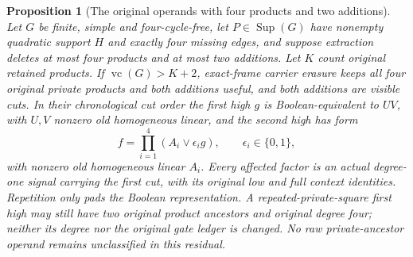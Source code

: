 \documentclass[11pt]{article}
\newcommand{\Sup}{\operatorname{Sup}}
\newcommand{\vc}{\operatorname{vc}}
\newtheorem{proposition}[theorem]{Proposition}
\theoremstyle{definition}
\theoremstyle{remark}
\begin{document}
\begin{proposition}[The original operands with four products and two additions]\label{prop:fourproductreduction}
Let $G$ be finite, simple and four-cycle-free, let $P\in\Sup(G)$ have nonempty quadratic support $H$ and exactly four missing edges, and suppose extraction deletes at most four products and at most two additions. Let $K$ count original retained products. If $\vc(G)>K+2$, exact-frame carrier erasure keeps all four original private products and both additions useful, and both additions are visible cuts. In their chronological cut order the first high $g$ is Boolean-equivalent to $UV$, with $U,V$ nonzero old homogeneous linear, and the second high has form
\[
 f=\prod_{i=1}^4(A_i\vee\epsilon_i g),\qquad \epsilon_i\in\{0,1\},
\]
with nonzero old homogeneous linear $A_i$. Every affected factor is an actual degree-one signal carrying the first cut, with its original low and full context identities. Repetition only pads the Boolean representation. A repeated-private-square first high may still have two original product ancestors and original degree four; neither its degree nor the original gate ledger is changed. No raw private-ancestor operand remains unclassified in this residual.
\end{proposition}
\end{document}
